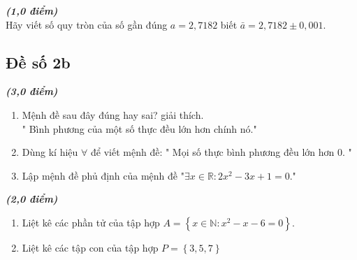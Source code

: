 \begin{bt} %
	\textit{\textbf{(1,0 điểm)}} 		\\
	Hãy viết số quy tròn của số gần đúng $ a = 2,7182 $ biết $\bar a = 2,7182 \pm 0,001.$
\end{bt}


\subsection{Đề số 2b}
\setcounter{bt}{0}
\begin{bt} %
	\textit{\textbf{(3,0 điểm)}} 	
	\begin{enumerate}
		\item Mệnh đề sau đây đúng hay sai? giải thích. \\
		" Bình phương của một số thực đều lớn hơn chính nó."
		\item Dùng kí hiệu $ \forall $ để viết mệnh đề:
		" Mọi số thực bình phương đều lớn hơn 0. "
		\item Lập mệnh đề phủ định của mệnh đề $ \text{"} \exists x \in \mathbb{R} : 2x^2 - 3x + 1 = 0.\text{"}  $		
	\end{enumerate}
	
\end{bt}
\begin{bt} %
	\textit{\textbf{(2,0 điểm)}} 		
	\begin{enumerate}
		\item Liệt kê các phần tử của tập hợp $ A = \left\{x \in \mathbb{N}: x^2 - x - 6 = 0 \right\}. $
		\item Liệt kê các tập con của tập hợp $ P = \left\{ {3,5,7} \right\} $
	\end{enumerate}
\end{bt}


